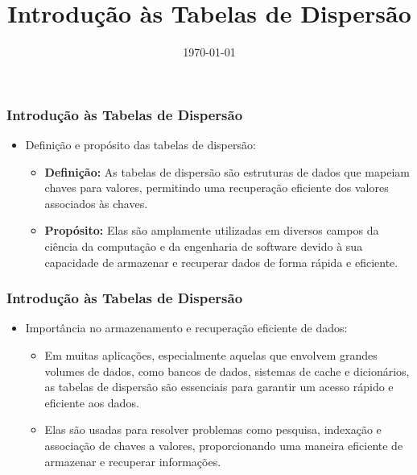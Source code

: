 \title{Introdução às Tabelas de Dispersão}
\date{\today}
\frame{\titlepage}

\begin{frame}[fragile]
  \frametitle{Introdução às Tabelas de Dispersão}
  \begin{itemize}
    \item Definição e propósito das tabelas de dispersão:
      \begin{itemize}
        \item \textbf{Definição:} As tabelas de dispersão são estruturas de dados que mapeiam chaves para valores, permitindo uma recuperação eficiente dos valores associados às chaves.
        \item \textbf{Propósito:} Elas são amplamente utilizadas em diversos campos da ciência da computação e da engenharia de software devido à sua capacidade de armazenar e recuperar dados de forma rápida e eficiente.
      \end{itemize}
  \end{itemize}
\end{frame}

\begin{frame}[fragile]
  \frametitle{Introdução às Tabelas de Dispersão}
  \begin{itemize}
    
    \item Importância no armazenamento e recuperação eficiente de dados:
      \begin{itemize}
        \item Em muitas aplicações, especialmente aquelas que envolvem grandes volumes de dados, como bancos de dados, sistemas de cache e dicionários, as tabelas de dispersão são essenciais para garantir um acesso rápido e eficiente aos dados.
        \item Elas são usadas para resolver problemas como pesquisa, indexação e associação de chaves a valores, proporcionando uma maneira eficiente de armazenar e recuperar informações.
      \end{itemize}
  \end{itemize}
\end{frame}

